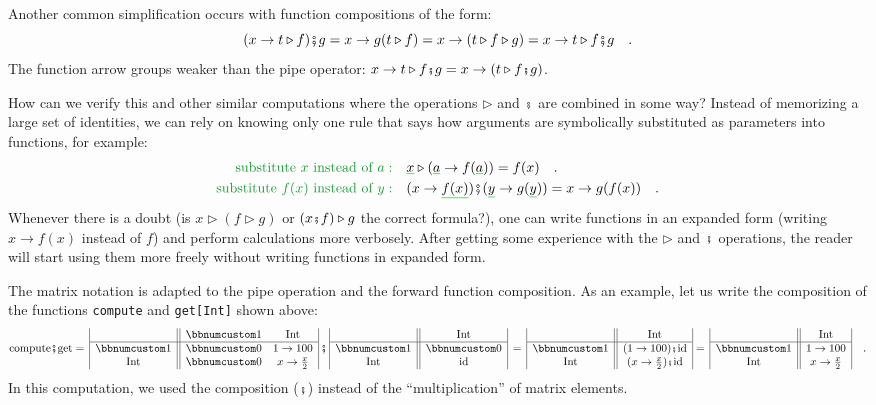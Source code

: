 Another common simplification occurs with function compositions of
the form:
\[
(x\rightarrow t\triangleright f)\bef g=x\rightarrow g(t\triangleright f)=x\rightarrow(t\triangleright f\triangleright g)=x\rightarrow t\triangleright f\bef g\quad.
\]
The function arrow groups weaker than the pipe operator: $x\rightarrow t\triangleright f\bef g=x\rightarrow(t\triangleright f\bef g)$.

How can we verify this and other similar computations where the operations
$\triangleright$ and $\bef$ are combined in some way? Instead of
memorizing a large set of identities, we can rely on knowing only
one rule that says how arguments are symbolically substituted as parameters
into functions, for example:
\begin{align*}
{\color{greenunder}\text{substitute }x\text{ instead of }a:}\quad & \gunderline x\triangleright(\gunderline a\rightarrow f(\gunderline a))=f(x)\quad.\\
{\color{greenunder}\text{substitute }f(x)\text{ instead of }y:}\quad & (x\rightarrow\gunderline{f(x)})\bef(\gunderline y\rightarrow g(\gunderline y))=x\rightarrow g(f(x))\quad.
\end{align*}
Whenever there is a doubt (is $x\triangleright(f\triangleright g)$
or $(x\bef f)\triangleright g$ the correct formula?), one can write
functions in an expanded form (writing $x\rightarrow f(x)$ instead
of $f$) and perform calculations more verbosely. After getting some
experience with the $\triangleright$ and $\bef$ operations, the
reader will start using them more freely without writing functions
in expanded form.

The matrix notation is adapted to the pipe operation and the forward
function composition. As an example, let us write the composition
of the functions \lstinline!compute! and \lstinline!get[Int]! shown
above: 
\[
\text{compute}\bef\text{get}=\,\begin{array}{|c||cc|}
 & \bbnum 1 & \text{Int}\\
\hline \bbnum 1 & \bbnum 0 & 1\rightarrow100\\
\text{Int} & \bbnum 0 & x\rightarrow\frac{x}{2}
\end{array}\,\bef\,\begin{array}{|c||c|}
 & \text{Int}\\
\hline \bbnum 1 & \bbnum 0\\
\text{Int} & \text{id}
\end{array}\,=\,\begin{array}{|c||c|}
 & \text{Int}\\
\hline \bbnum 1 & (1\rightarrow100)\bef\text{id}\\
\text{Int} & (x\rightarrow\frac{x}{2})\bef\text{id}
\end{array}=\,\begin{array}{|c||c|}
 & \text{Int}\\
\hline \bbnum 1 & 1\rightarrow100\\
\text{Int} & x\rightarrow\frac{x}{2}
\end{array}\quad.
\]
In this computation, we used the composition ($\bef$) instead of
the \textsf{``}multiplication\textsf{''} of matrix elements.

